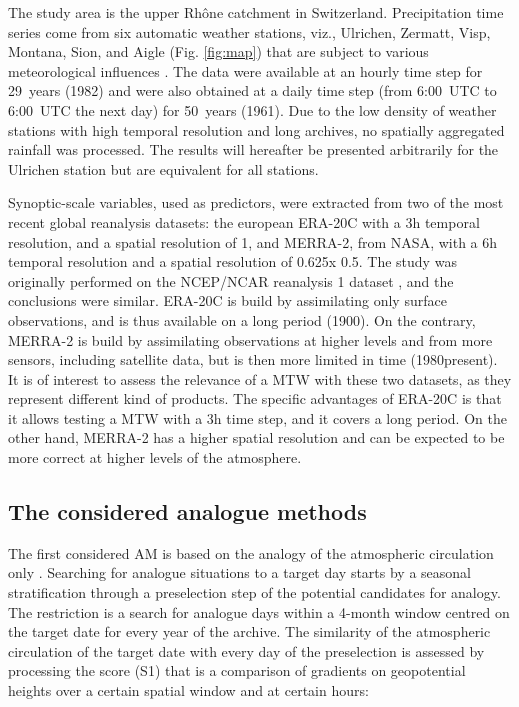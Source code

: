 \documentclass[hess, manuscript]{copernicus}
\begin{document}
	The study area is the upper Rh\^{o}ne catchment in Switzerland. Precipitation time series come from six automatic weather stations, viz., Ulrichen, Zermatt, Visp, Montana, Sion, and Aigle (Fig. \ref{fig:map}) that are subject to various meteorological influences \citep{Horton2012}. The data were available at an hourly time step for 29~years (1982) and were also obtained at a daily time step (from 6:00~UTC to 6:00~UTC the next day) for 50~years (1961). Due to the low density of weather stations with high temporal resolution and long archives, no spatially aggregated rainfall was processed. The results will hereafter be presented arbitrarily for the Ulrichen station but are equivalent for all stations.
	
	Synoptic-scale variables, used as predictors, were extracted from two of the most recent global reanalysis datasets: the european ERA-20C \citep{Poli2016} with a 3h temporal resolution, and a spatial resolution of 1\textdegree, and MERRA-2, from NASA, with a 6h temporal resolution and a spatial resolution of 0.625\textdegree x 0.5\textdegree. The study was originally performed on the NCEP/NCAR reanalysis 1 dataset \citep{Kalnay1996}, and the conclusions were similar. ERA-20C is build by assimilating only surface observations, and is thus available on a long period (1900). On the contrary, MERRA-2 is build by assimilating observations at higher levels and from more sensors, including satellite data, but is then more limited in time (1980\textendash present). It is of interest to assess the relevance of a MTW with these two datasets, as they represent different kind of products. The specific advantages of ERA-20C is that it allows testing a MTW with a 3h time step, and it covers a long period. On the other hand, MERRA-2 has a higher spatial resolution and can be expected to be more correct at higher levels of the atmosphere.
	
	\subsection{The considered analogue methods}
	\label{sec:analog_method}
	
	The first considered AM is based on the analogy of the atmospheric circulation only \citep[Table \ref{table:method_2Z},][]{Obled2002, Bontron2005}. Searching for analogue situations to a target day starts by a seasonal stratification through a preselection step of the potential candidates for analogy. The restriction is a search for analogue days within a 4-month window centred on the target date for every year of the archive. The similarity of the atmospheric circulation of the target date with every day of the preselection is assessed by processing the \citet{Teweles1954} score (S1) that is a comparison of gradients on geopotential heights over a certain spatial window and at certain hours:
	
\end{document}
